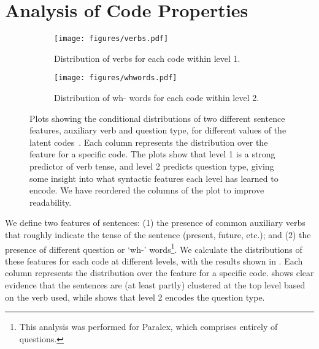 \documentclass[11pt]{article}
\begin{document}
\section{Analysis of Code Properties}


\begin{figure}[t!]
    \centering
    \begin{subfigure}{0.44\textwidth}
        \raggedleft
        \texttt{[image: figures/verbs.pdf]}
        \caption{Distribution of verbs for each code within level 1.}
        \label{fig:verbs}
    \end{subfigure} \begin{subfigure}{0.46\textwidth}
        \raggedleft
        \texttt{[image: figures/whwords.pdf]}
        \caption{Distribution of wh- words for each code within level 2.}
        \label{fig:whwords}
    \end{subfigure}


    \caption{Plots showing the conditional distributions of two
      different sentence features, auxiliary verb and question type,
      for different values of the latent codes~. Each column
      represents the distribution over the feature for a specific
      code. The plots show that level 1 is a strong predictor of verb
      tense, and level 2 predicts question type, giving some insight
      into what syntactic features each level has learned to
      encode. We have reordered the columns of the plot to improve
      readability.}
\label{fig:heads}
\end{figure}

We define two
features of sentences: (1) the presence of common auxiliary verbs that
roughly indicate the tense of the sentence (present, future, etc.);
and (2) the presence of different question or `wh-'
words\footnote{This analysis was performed for Paralex, which
  comprises entirely of questions.}. We calculate the distributions of
these features for each code  at different levels, with the
results shown in . Each column represents the
distribution over the feature for a specific code. 
shows clear evidence that the sentences are (at least partly)
clustered at the top level based on the verb used, while
 shows that level 2 encodes the question type.
\end{document}
